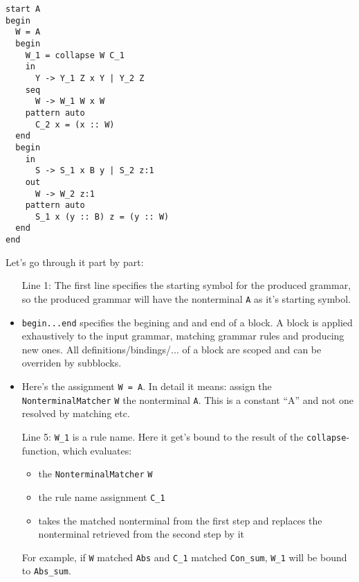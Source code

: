 \documentclass[a4paper]{article}
\begin{document}
\begin{lstlisting}[language=transformer]
start A
begin
  W = A
  begin
    W_1 = collapse W C_1 
    in
      Y -> Y_1 Z x Y | Y_2 Z
    seq
      W -> W_1 W x W
    pattern auto
      C_2 x = (x :: W)
  end
  begin
    in
      S -> S_1 x B y | S_2 z:1
    out
      W -> W_2 z:1
    pattern auto
      S_1 x (y :: B) z = (y :: W)
  end  
end
\end{lstlisting}
Let's go through it part by part:
\begin{itemize}
\item[Line 1:\hspace{0.5em}] 
The first line specifies the starting symbol for the produced grammar, so the produced grammar will have the nonterminal \lstinline[language=transformer]{A} as it's starting symbol.  
\item[Lines 2 and 21:\hspace{0.5em}] 
\lstinline[language=transformer]{begin...end} specifies the begining and and end of a block. A block is applied exhaustively to the input grammar, matching grammar rules and producing new ones. All definitions/bindings/... of a block are scoped and can be overriden by subblocks.
\item[Line 3:\hspace{0.5em}] 
Here's the assignment \lstinline[language=transformer]{W = A}. In detail it means: assign the \lstinline[language=scala]{NonterminalMatcher} \lstinline[language=transformer]{W} the nonterminal \lstinline[language=transformer]{A}. This is a constant ``A'' and not one resolved by matching etc.
\item[Line 5:\hspace{0.5em}] 
\lstinline[language=transformer]{W_1} is a rule name. Here it get's bound to the result of the \lstinline[language=scala]{collapse}-function, which evaluates:
\begin{itemize}
\item 
the \lstinline[language=scala]{NonterminalMatcher} \lstinline[language=transformer]{W}
\item 
the rule name assignment \lstinline[language=transformer]{C_1}
\item 
takes the matched nonterminal from the first step and replaces the nonterminal retrieved from the second step by it
\end{itemize}
For example, if \lstinline[language=transformer]{W} matched \lstinline[language=grammar]{Abs} and \lstinline[language=transformer]{C_1} matched \lstinline[language=grammar]{Con_sum}, 
\lstinline[language=transformer]{W_1} will be bound to \lstinline[language=grammar]{Abs_sum}. \\

\end{itemize}
\end{document}
